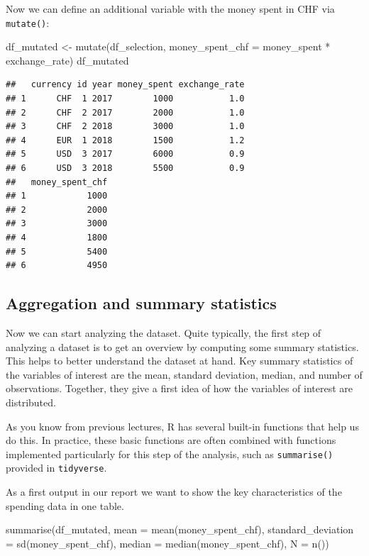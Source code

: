 \documentclass[
  12pt,
]{style/krantz}
\newenvironment{Shaded}{\begin{snugshade}}{\end{snugshade}}
\newcommand{\AttributeTok}[1]{\textcolor[rgb]{0.77,0.63,0.00}{#1}}
\newcommand{\FunctionTok}[1]{\textcolor[rgb]{0.00,0.00,0.00}{#1}}
\newcommand{\NormalTok}[1]{#1}
\newcommand{\OtherTok}[1]{\textcolor[rgb]{0.56,0.35,0.01}{#1}}
\newcommand{\SpecialCharTok}[1]{\textcolor[rgb]{0.00,0.00,0.00}{#1}}
\begin{document}
Now we can define an additional variable with the money spent in CHF via \texttt{mutate()}:

\begin{Shaded}
\begin{Highlighting}[]
\NormalTok{df\_mutated }\OtherTok{\textless{}{-}} \FunctionTok{mutate}\NormalTok{(df\_selection, }\AttributeTok{money\_spent\_chf =}\NormalTok{ money\_spent }\SpecialCharTok{*}\NormalTok{ exchange\_rate)}
\NormalTok{df\_mutated}
\end{Highlighting}
\end{Shaded}

\begin{verbatim}
##   currency id year money_spent exchange_rate
## 1      CHF  1 2017        1000           1.0
## 2      CHF  2 2017        2000           1.0
## 3      CHF  2 2018        3000           1.0
## 4      EUR  1 2018        1500           1.2
## 5      USD  3 2017        6000           0.9
## 6      USD  3 2018        5500           0.9
##   money_spent_chf
## 1            1000
## 2            2000
## 3            3000
## 4            1800
## 5            5400
## 6            4950
\end{verbatim}

\hypertarget{aggregation-and-summary-statistics}{%
\subsection{Aggregation and summary statistics}\label{aggregation-and-summary-statistics}}

Now we can start analyzing the dataset. Quite typically, the first step of analyzing a dataset is to get an overview by computing some summary statistics. This helps to better understand the dataset at hand. Key summary statistics of the variables of interest are the mean, standard deviation, median, and number of observations. Together, they give a first idea of how the variables of interest are distributed.

As you know from previous lectures, R has several built-in functions that help us do this. In practice, these basic functions are often combined with functions implemented particularly for this step of the analysis, such as \texttt{summarise()} provided in \texttt{tidyverse}.

As a first output in our report we want to show the key characteristics of the spending data in one table.

\begin{Shaded}
\begin{Highlighting}[]
\FunctionTok{summarise}\NormalTok{(df\_mutated, }
          \AttributeTok{mean =} \FunctionTok{mean}\NormalTok{(money\_spent\_chf),}
          \AttributeTok{standard\_deviation =} \FunctionTok{sd}\NormalTok{(money\_spent\_chf),}
          \AttributeTok{median =} \FunctionTok{median}\NormalTok{(money\_spent\_chf),}
          \AttributeTok{N =} \FunctionTok{n}\NormalTok{())}
\end{Highlighting}
\end{Shaded}
\end{document}
